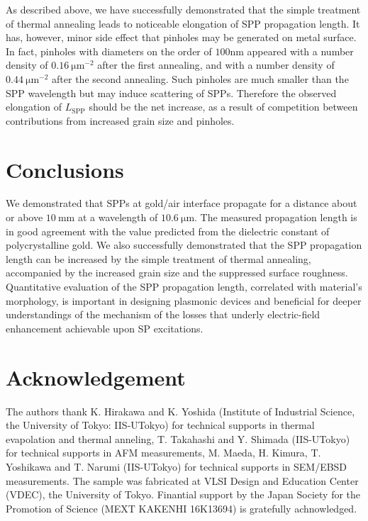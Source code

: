 \documentclass[aip,apl,reprint]{revtex4-1}
\begin{document}
As described above, we have successfully demonstrated that the simple treatment of thermal annealing leads to noticeable elongation of SPP propagation length. It has, however, minor side effect that pinholes may be generated on metal surface. \color{red}In fact, pinholes with diameters on the order of $100 \mathrm{ nm}$ \color{black}appeared with a number density of $0.16\:\mathrm{\mu m}^{-2}$ after the first annealing, and with a number density of $0.44\:\mathrm{\mu m}^{-2}$ after the second annealing. Such pinholes are much smaller than the SPP wavelength but may induce scattering of SPPs. \color{red}Therefore the observed elongation of $L_{\mathrm{SPP}}$ should be the net increase, as a result of competition between contributions from increased grain size and pinholes.\color{black}
	
\section{Conclusions}
\label{sec:conclusion}
We demonstrated that SPPs at gold/air interface propagate for a distance about or above $10\:\mathrm{mm}$ at a wavelength of $10.6\:\mathrm{\mu m}$. The measured propagation length is in good agreement with the value predicted from the dielectric constant of polycrystalline gold. We also successfully demonstrated that the SPP propagation length can be increased by the simple treatment of thermal annealing, accompanied by the increased grain size and the suppressed surface roughness. Quantitative evaluation of the SPP propagation length, correlated with material's morphology, is important in designing plasmonic devices and beneficial for deeper understandings of the mechanism of the losses that underly electric-field enhancement achievable upon SP excitations.

\section*{Acknowledgement}
The authors thank K. Hirakawa and K. Yoshida (Institute of Industrial Science, the University of Tokyo: IIS-UTokyo) for technical supports in thermal evapolation and thermal anneling, T. Takahashi and Y. Shimada (IIS-UTokyo) for technical supports in AFM measurements, M. Maeda, H. Kimura, T. Yoshikawa and T. Narumi (IIS-UTokyo) for technical supports in SEM/EBSD measurements.
The sample was fabricated at VLSI Design and Education Center (VDEC), the University of Tokyo. Finantial support by the Japan Society for the Promotion of Science (MEXT KAKENHI 16K13694) is gratefully achnowledged.


\end{document}
